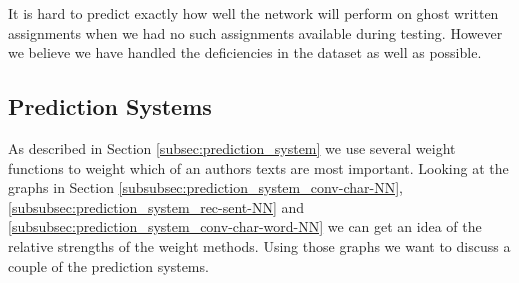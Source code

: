 It is hard to predict exactly how well the network will perform on ghost written
assignments when we had no such assignments available during testing. However we
believe we have handled the deficiencies in the dataset as well as possible.


\subsection{Prediction Systems}

As described in Section \ref{subsec:prediction_system} we use several weight
functions to weight which of an authors texts are most important. Looking
at the graphs in Section \ref{subsubsec:prediction_system_conv-char-NN},
\ref{subsubsec:prediction_system_rec-sent-NN} and
\ref{subsubsec:prediction_system_conv-char-word-NN} we can get an idea of the
relative strengths of the weight methods. Using those graphs we want to discuss
a couple of the prediction systems.

